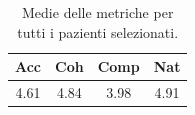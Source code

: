 
\begin{table}[!h]
\centering
\begin{tabular}{||c c c c||}
\hline
Acc & Coh & Comp & Nat \\ [0.5ex]
\hline\hline
4.61 & 4.84 & 3.98 & 4.91 \\
\hline
\end{tabular}
\caption{Medie delle metriche per tutti i pazienti selezionati.}
\label{tab:metriche_finali_pazienti}
\end{table}

